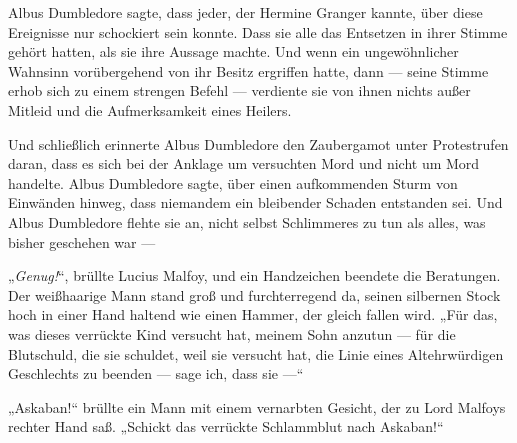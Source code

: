 Albus Dumbledore sagte, dass jeder, der Hermine Granger kannte, über diese Ereignisse nur schockiert sein konnte. Dass sie alle das Entsetzen in ihrer Stimme gehört hatten, als sie ihre Aussage machte. Und wenn ein ungewöhnlicher Wahnsinn vorübergehend von ihr Besitz ergriffen hatte, dann — seine Stimme erhob sich zu einem strengen Befehl — verdiente sie von ihnen nichts außer Mitleid und die Aufmerksamkeit eines Heilers.

Und schließlich erinnerte Albus Dumbledore den Zaubergamot unter Protestrufen daran, dass es sich bei der Anklage um versuchten Mord und nicht um Mord handelte. Albus Dumbledore sagte, über einen aufkommenden Sturm von Einwänden hinweg, dass niemandem ein bleibender Schaden entstanden sei. Und Albus Dumbledore flehte sie an, nicht selbst Schlimmeres zu tun als alles, was bisher geschehen war —

„\emph{Genug!}“, brüllte Lucius Malfoy, und ein Handzeichen beendete die Beratungen. Der weißhaarige Mann stand groß und furchterregend da, seinen silbernen Stock hoch in einer Hand haltend wie einen Hammer, der gleich fallen wird.
„Für das, was dieses verrückte Kind versucht hat, meinem Sohn anzutun — für die Blutschuld, die sie schuldet, weil sie versucht hat, die Linie eines Altehrwürdigen Geschlechts zu beenden — sage ich, dass sie —“

„Askaban!“ brüllte ein Mann mit einem vernarbten Gesicht, der zu Lord Malfoys rechter Hand saß.
„Schickt das verrückte Schlammblut nach Askaban!“

